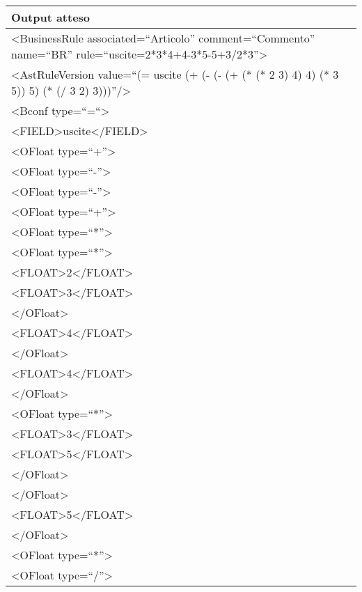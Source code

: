 \begin{center}
\begin{tabular}{|p{11cm}|} \hline
\textbf{Output atteso}\\ \hline
\textless BusinessRule associated=``Articolo'' comment=``Commento'' name=``BR'' rule=``uscite=2*3*4+4-3*5-5+3/2*3''\textgreater\\
 \textless AstRuleVersion value=``(= uscite (+ (- (- (+ (* (* 2 3) 4) 4) (* 3 5)) 5) (* (/ 3 2) 3)))''/\textgreater\\
 \textless Bconf type=``=``\textgreater\\
 \textless FIELD\textgreater uscite\textless /FIELD\textgreater\\
 \textless OFloat type=``+''\textgreater\\
 \textless OFloat type=``-''\textgreater\\
 \textless OFloat type=``-''\textgreater \\
\textless OFloat type=``+''\textgreater \\
\textless OFloat type=``*''\textgreater\\
 \textless OFloat type=``*''\textgreater\\
 \textless FLOAT\textgreater 2\textless /FLOAT\textgreater\\
 \textless FLOAT\textgreater 3\textless /FLOAT\textgreater\\
 \textless /OFloat\textgreater\\
 \textless FLOAT\textgreater 4\textless /FLOAT\textgreater\\
 \textless /OFloat\textgreater\\
 \textless FLOAT\textgreater 4\textless /FLOAT\textgreater\\
 \textless /OFloat\textgreater\\
 \textless OFloat type=``*''\textgreater\\
 \textless FLOAT\textgreater 3\textless /FLOAT\textgreater\\
 \textless FLOAT\textgreater 5\textless /FLOAT\textgreater\\
 \textless /OFloat\textgreater\\
 \textless /OFloat\textgreater\\
 \textless FLOAT\textgreater 5\textless /FLOAT\textgreater\\
 \textless /OFloat\textgreater\\
 \textless OFloat type=``*''\textgreater\\
 \textless OFloat type=``/''\textgreater\\

\end{tabular}
\end{center}
